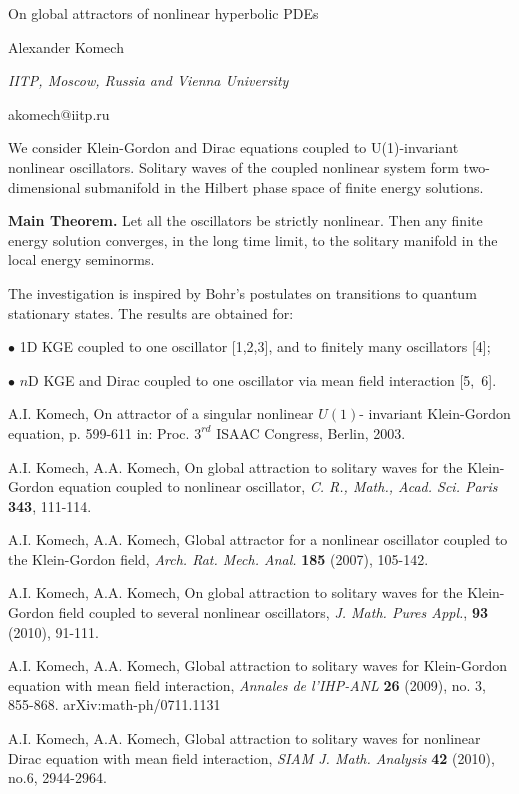 \documentclass[10pt,a4paper]{article}
\begin{document}
\begin{center}

{\Large On global attractors  of  nonlinear hyperbolic PDEs}

\bigskip

{\sc Alexander Komech}

{\small\it IITP, Moscow, Russia and Vienna University}

{\small\rm akomech@iitp.ru}


\end{center}

\bigskip


We consider Klein-Gordon and Dirac equations
coupled to U(1)-invariant nonlinear
oscillators. Solitary waves of the coupled nonlinear system form
two-dimensional submanifold in the Hilbert phase space of finite
energy solutions. 
\medskip

\noindent
{\bf Main Theorem.}
Let all the oscillators be  strictly nonlinear.
Then  any finite energy solution converges,
in the long time limit,
to the solitary manifold
in the local energy seminorms.

\medskip

The investigation is inspired by Bohr's postulates on transitions to
quantum stationary states.
The results are obtained for:

\medskip

\noindent
$\bullet$
1D KGE coupled to one oscillator [1,2,3], and to finitely many
oscillators [4];

\medskip

\noindent
$\bullet$
$n$D KGE  and Dirac coupled to one oscillator via mean field
interaction [5,~6].

\bigskip

\noindent
[1] A.I. Komech, On attractor of a singular nonlinear
$U(1)$- invariant Klein-Gordon equation, p. 599-611 in: Proc.
$3^{rd}$ ISAAC Congress,  Berlin, 2003.

\smallskip
\noindent
[2] A.I. Komech, A.A. Komech,
On global attraction to solitary waves for the
Klein-Gordon equation coupled to nonlinear oscillator,
{\em C. R., Math., Acad. Sci. Paris} {\bf 343},  111-114.

\smallskip
\noindent
[3] A.I. Komech, A.A. Komech,
Global attractor for a nonlinear oscillator coupled
to the Klein-Gordon field,
{\em Arch. Rat. Mech. Anal.} {\bf 185} (2007), 105-142.

\smallskip
\noindent
[4] A.I. Komech, A.A. Komech, On global attraction to solitary
waves for the Klein-Gordon field coupled to several nonlinear
oscillators, {\em J. Math. Pures Appl.},
{\bf 93} (2010), 91-111. 

\smallskip
\noindent
[5] A.I. Komech, A.A. Komech, Global attraction to solitary waves
for Klein-Gordon equation with mean field interaction, {\em Annales
de l'IHP-ANL} {\bf 26} (2009), no. 3,  855-868.
arXiv:math-ph/0711.1131

\smallskip
\noindent
[6] A.I. Komech, A.A. Komech, Global attraction to solitary waves
for nonlinear Dirac equation with mean field interaction, 
{\em SIAM J. Math. Analysis} {\bf 42} (2010), no.6, 2944-2964.
\end{document}
